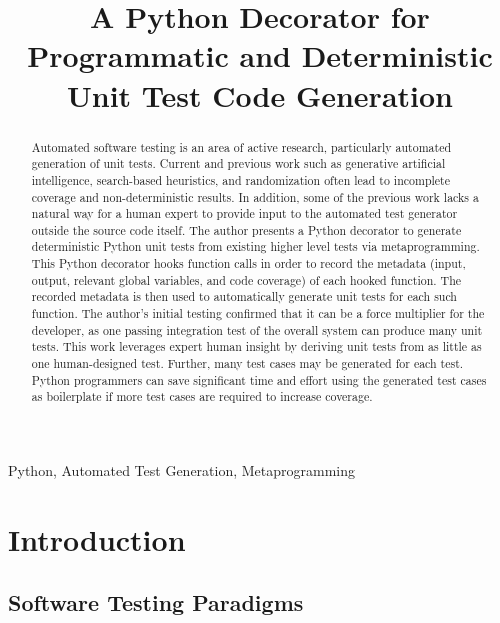 \documentclass[10pt, conference]{IEEEtran}
\begin{document}
\title{A Python Decorator for Programmatic and Deterministic Unit Test Code Generation\\}

\author{
}
\maketitle

\begin{abstract}
Automated software testing is an area of active research, 
    particularly automated generation of unit tests. 
Current and previous work such as generative artificial intelligence, search-based heuristics, and 
    randomization often lead to incomplete coverage and non-deterministic results.
In addition, some of the previous work lacks a natural way for a human expert 
    to provide input to the automated test generator outside the source code itself. 
The author presents a Python decorator to generate deterministic Python 
    unit tests from existing higher level tests via metaprogramming.  
This Python decorator hooks function calls in order to record the 
    metadata (input, output, relevant global variables, and code coverage) 
    of each hooked function. 
The recorded metadata is then used to automatically generate unit 
    tests for each such function.
The author's initial testing confirmed that it can 
    be a force multiplier for the developer, 
    as one passing integration test of the overall 
    system can produce many unit tests.  
This work leverages expert human insight by deriving unit tests
    from as little as one human-designed test.
Further, many test cases may be generated for each test.  
    Python programmers can save significant time and effort using the 
    generated test cases as boilerplate if more test cases are required to 
    increase coverage.  


  \end{abstract} 
\begin{IEEEkeywords}
Python, Automated Test Generation, Metaprogramming
\end{IEEEkeywords}

\section{Introduction}\label{sec:introduction}

\subsection{Software Testing Paradigms}\label{sec:intro-3}
\end{document}
